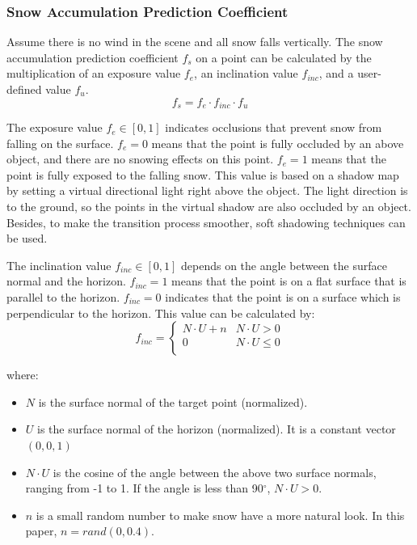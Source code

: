 \documentclass{article}
\begin{document}
\subsubsection {Snow Accumulation Prediction Coefficient}
Assume there is no wind in the scene and all snow falls vertically. The snow accumulation prediction coefficient \( f_{s} \) on a 
point can be calculated by the multiplication of an exposure value \( f_{e} \), an inclination value \( f_{inc} \), and a user-defined 
value \( f_{u} \).
\[
  f_{s} = f_{e} \cdot f_{inc} \cdot f_{u}
\]

The exposure value \( f_{e} \in [0, 1] \) indicates occlusions that prevent snow from falling on the surface. \( f_{e}=0 \) means that 
the point is fully occluded by an above object, and there are no snowing effects on this point. \( f_{e}=1 \) means that the point is 
fully exposed to the falling snow. This value is based on a shadow map by setting a virtual directional light right above the object. 
The light direction is to the ground, so the points in the virtual shadow are also occluded by an object. Besides, to make the 
transition process smoother, soft shadowing techniques can be used. 

The inclination value \( f_{inc} \in [0, 1] \) depends on the angle between the surface normal and the horizon. \( f_{inc}=1 \) means 
that the point is on a flat surface that is parallel to the horizon. \( f_{inc}=0 \) indicates that the point is on a surface which is 
perpendicular to the horizon. This value can be calculated by:
\[
  f_{inc}=
  \left\{
    \begin{array}{ll}
      N \cdot U + n & N \cdot U > 0 \\
      0 & N \cdot U \leq 0 \\
    \end{array} 
  \right. 
\]

where:
\begin{itemize}
  \item \( N \) is the surface normal of the target point (normalized).
  \item \( U \) is the surface normal of the horizon (normalized). It is a constant vector \((0, 0, 1)\)
  \item \( N \cdot U \) is the cosine of the angle between the above two surface normals, ranging from -1 to 1. If the angle is less 
  than 90$^{\circ}$, \( N \cdot U > 0\).
  \item \( n \) is a small random number to make snow have a more natural look. In this paper, \(n = rand(0, 0.4)\).
\end{itemize}
\end{document}

